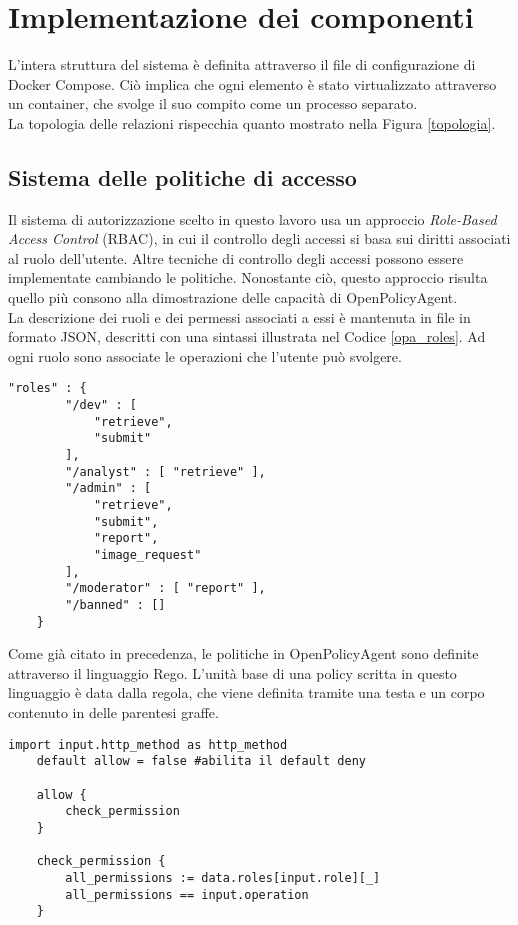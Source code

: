 \section{Implementazione dei componenti}
L'intera struttura del sistema è definita attraverso il file di configurazione di Docker Compose. Ciò implica che ogni 
elemento è stato virtualizzato attraverso un container, che svolge il suo compito come un processo separato. 
\\ La topologia delle relazioni rispecchia quanto mostrato nella Figura \ref*{topologia}. 


\subsection{Sistema delle politiche di accesso}
Il sistema di autorizzazione scelto in questo lavoro usa un approccio \textit{Role-Based Access Control} (RBAC), in cui il 
controllo degli accessi si basa sui diritti associati al ruolo dell'utente. 
Altre tecniche di controllo degli accessi possono essere implementate cambiando le politiche. Nonostante ciò, 
questo approccio risulta quello più consono alla dimostrazione delle capacità di OpenPolicyAgent.
\\ La descrizione dei ruoli e dei permessi associati a essi è mantenuta in file in formato JSON, descritti con una sintassi illustrata nel Codice \ref*{opa_roles}.
Ad ogni ruolo sono associate le operazioni che l'utente può svolgere.
\lstset{language=nginx}
\begin{lstlisting}[caption={[Descrizione dei ruoli in JSON]Descrizione dei ruoli e dei relativi permessi in formato JSON.},captionpos=b,label=opa_roles]
    "roles" : {
        "/dev" : [
            "retrieve", 
            "submit"
        ],
        "/analyst" : [ "retrieve" ],
        "/admin" : [ 
            "retrieve", 
            "submit",
            "report",
            "image_request"
        ],
        "/moderator" : [ "report" ], 
        "/banned" : []
    }
\end{lstlisting}
Come già citato in precedenza, le politiche in OpenPolicyAgent sono definite attraverso il linguaggio Rego. L'unità base di una policy scritta in questo linguaggio è data 
dalla regola, che viene definita tramite una testa e un corpo contenuto in delle parentesi graffe. 
\begin{lstlisting}[caption={[Policy in linguaggio Rego]Policy in linguaggio Rego. Il simbolo ":=" indica un assegnamento di valore, mentre "==" permette di confrontare l'uguaglianza fra i valori delle due variabili. L'indice "\_" permette di considerare tutti i valori di una dimensione di un vettore.},captionpos=b,label=opa_policy]
    import input.http_method as http_method   
    default allow = false #abilita il default deny

    allow {
        check_permission
    }

    check_permission {
        all_permissions := data.roles[input.role][_]
        all_permissions == input.operation
    }
\end{lstlisting}

